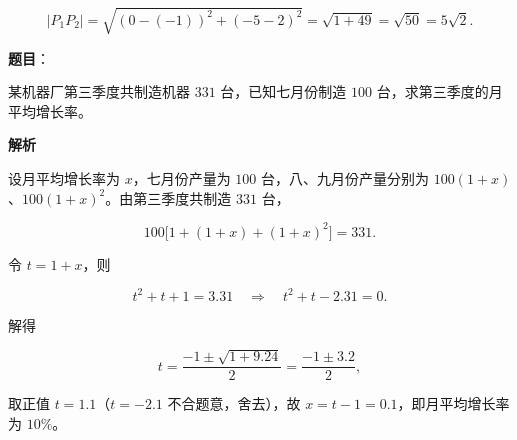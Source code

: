 \begin{answer}
\nopagebreak[4]
\[
|P_1P_2|=\sqrt{(0-(-1))^2+(-5-2)^2}=\sqrt{1+49}=\sqrt{50}=5\sqrt2.
\]






\end{answer}
\begin{answer}

\textbf{题目}：

某机器厂第三季度共制造机器 $331$ 台，已知七月份制造 $100$ 台，求第三季度的月平均增长率。

\textbf{解析}

设月平均增长率为 $x$，七月份产量为 $100$ 台，八、九月份产量分别为 $100(1+x)$、$100(1+x)^2$。由第三季度共制造 $331$ 台，

\nopagebreak[4]
\[
100\bigl[1+(1+x)+(1+x)^2\bigr]=331.
\]

令 $t=1+x$，则

\nopagebreak[4]
\[
t^2+t+1=3.31\quad\Longrightarrow\quad t^2+t-2.31=0.
\]

解得

\nopagebreak[4]
\[
t=\frac{-1\pm\sqrt{1+9.24}}2=\frac{-1\pm3.2}2,
\]

取正值 $t=1.1$（$t=-2.1$ 不合题意，舍去），故 $x=t-1=0.1$，即月平均增长率为 $10\%$。


\end{answer}
